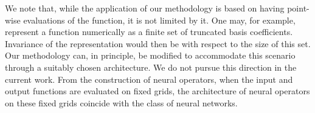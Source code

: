 We note that, while the application of our methodology is based on having point-wise evaluations of the function, it is not limited by it. One may, for example, represent a function numerically as a finite set of truncated basis coefficients. Invariance of the representation would then be with respect to the size of this set. Our methodology can, in principle, be modified to accommodate this scenario through a suitably chosen architecture. We do not pursue this direction in the current work. From the construction of neural operators, when the input and output functions are evaluated on fixed grids, the architecture of neural operators on these fixed grids coincide with the class of neural networks. 